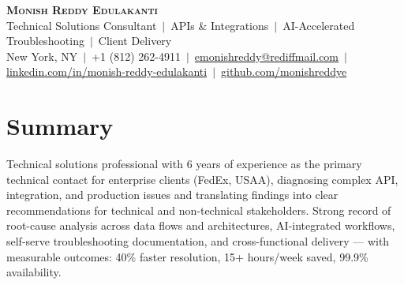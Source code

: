 \documentclass[letterpaper,10.5pt]{article}
\begin{document}
\begin{center}
    \textbf{\Huge \scshape Monish Reddy Edulakanti} \\ \vspace{2pt}
    \small Technical Solutions Consultant \,$|$\, APIs \& Integrations \,$|$\, AI-Accelerated Troubleshooting \,$|$\, Client Delivery \\ \vspace{2pt}
    \small New York, NY \,$|$\, +1 (812) 262-4911 \,$|$\,
    \href{mailto:emonishreddy@rediffmail.com}{emonishreddy@rediffmail.com} \,$|$\,
    \href{https://linkedin.com/in/monish-reddy-edulakanti}{linkedin.com/in/monish-reddy-edulakanti} \,$|$\,
    \href{https://github.com/monishreddye}{github.com/monishreddye}
\end{center}

\section{Summary}
\small{Technical solutions professional with 6 years of experience as the primary technical contact for enterprise clients (FedEx, USAA), diagnosing complex API, integration, and production issues and translating findings into clear recommendations for technical and non-technical stakeholders. Strong record of root-cause analysis across data flows and architectures, AI-integrated workflows, self-serve troubleshooting documentation, and cross-functional delivery --- with measurable outcomes: 40\% faster resolution, 15+ hours/week saved, 99.9\% availability.}

\end{document}
